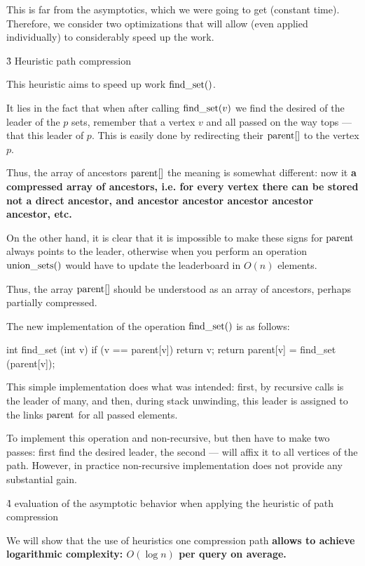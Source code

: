 This is far from the asymptotics, which we were going to get (constant time). Therefore, we consider two optimizations that will allow (even applied individually) to considerably speed up the work.



\h3{ Heuristic path compression }

This heuristic aims to speed up work ${\rm find\_set}()$.

It lies in the fact that when after calling ${\rm find\_set}(v)$ we find the desired of the leader of the $p$ sets, remember that a vertex $v$ and all passed on the way tops --- that this leader of $p$. This is easily done by redirecting their ${\rm parent}[]$ to the vertex $p$.

Thus, the array of ancestors ${\rm parent}[]$ the meaning is somewhat different: now it \bf{a compressed array of ancestors}, i.e. for every vertex there can be stored not a direct ancestor, and ancestor ancestor ancestor ancestor ancestor, etc.

On the other hand, it is clear that it is impossible to make these signs for ${\rm parent}$ always points to the leader, otherwise when you perform an operation ${\rm union\_sets}()$ would have to update the leaderboard in $O(n)$ elements.

Thus, the array ${\rm parent}[]$ should be understood as an array of ancestors, perhaps partially compressed.

The new implementation of the operation ${\rm find\_set}()$ is as follows:

\code
int find_set (int v) {
if (v == parent[v])
return v;
return parent[v] = find_set (parent[v]);
}
\endcode

This simple implementation does what was intended: first, by recursive calls is the leader of many, and then, during stack unwinding, this leader is assigned to the links ${\rm parent}$ for all passed elements.

To implement this operation and non-recursive, but then have to make two passes: first find the desired leader, the second --- will affix it to all vertices of the path. However, in practice non-recursive implementation does not provide any substantial gain.


\h4{ evaluation of the asymptotic behavior when applying the heuristic of path compression }

We will show that the use of heuristics one compression path \bf{allows to achieve logarithmic complexity}: $O(\log n)$ per query on average.


